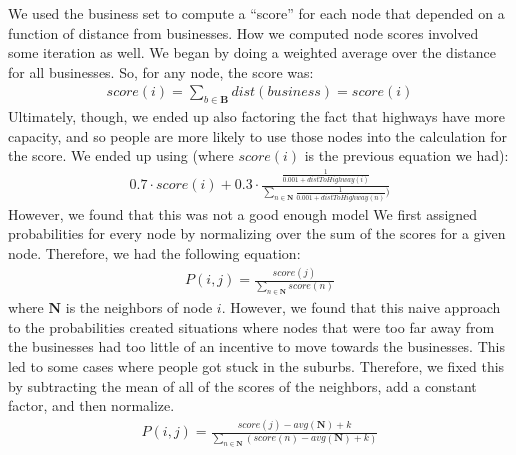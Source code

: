 \documentclass{article}
\begin{document}
We used the business set to compute a ``score'' for each node that depended on a function of distance from businesses. How we computed node scores involved some iteration as well. We began by doing a weighted average over the distance for all businesses. So, for any node, the score was:
\begin{eqnarray*}
	score(i) = \sum\limits_{b \in \mathbf{B}} dist(business) = score(i)
\end{eqnarray*}
Ultimately, though, we ended up also factoring the fact that highways have more capacity, and so people are more likely to use those nodes into the calculation for the score. We ended up using (where $score(i)$ is the previous equation we had):
\begin{eqnarray*}
	0.7 \cdot score(i)+ 0.3 \cdot \frac{\frac{1}{0.001 + distToHighway(i)}}{\sum\limits_{n \in \mathbf{N}} \frac{1}{0.001 + distToHighway(n)})}
\end{eqnarray*}
However, we found that this was not a good enough model 
We first assigned probabilities for every node by normalizing over the sum of the scores for a given node. Therefore, we had the following equation: \\
\begin{eqnarray*}
	P(i,j) = \frac{score(j)}{\sum\limits_{n \in \mathbf{N}} score(n)}
\end{eqnarray*}
where $\mathbf{N}$ is the neighbors of node $i$.
However, we found that this naive approach to the probabilities created situations where nodes that were too far away from the businesses had too little of an incentive to move towards the businesses. This led to some cases where people got stuck in the suburbs. Therefore, we fixed this by subtracting the mean of all of the scores of the neighbors, add a constant factor, and then normalize.
\begin{eqnarray*}
	P(i,j) = \frac{score(j) - avg(\mathbf{N}) + k}{\sum\limits_{n \in \mathbf{N}} (score(n) - avg(\mathbf{N}) + k)}
\end{eqnarray*}
\end{document}

